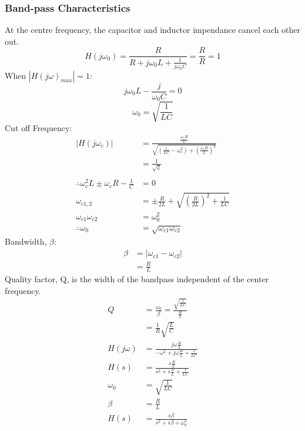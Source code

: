 \documentclass[a5paper]{article}
\begin{document}
	\subsubsection{Band-pass Characteristics}
	At the centre frequency, the capacitor and inductor impendance cancel each other out.
	$$H(j\omega_{0})=\frac{R}{R+j\omega_{0}L+\frac{1}{j\omega_{0}C}}=\frac{R}{R}=1$$
	When $|H(j\omega)_{max}|=1$:
	$$j\omega_{0}L-\frac{j}{\omega_{0}C}=0$$
	$$\omega_{0}=\sqrt{\frac{1}{LC}}$$
	Cut off Frequency:
	\begin{align*}
		|H(j\omega_{c})|&=\frac{\frac{\omega_{c}R}{L}}{\sqrt{\left(\frac{1}{LC}-\omega_{c}^{2}\right)+\left(\frac{\omega_{c}R}{L}\right)^{2}}}\\
		&=\frac{1}{\sqrt{2}}\\\\
		\therefore\omega_{c}^{2}L\pm\omega_{c}R-\frac{1}{C}&=0\\
		\omega_{c1,2}&=\pm\frac{R}{2L}+\sqrt{\left(\frac{R}{2L}\right)^{2}+\frac{1}{LC}}\\
		\omega_{c1}\omega_{c2}&=\omega_{0}^{2}\\
		\therefore\omega_{0}&=\sqrt{\omega_{c1}\omega_{c2}}
	\end{align*}
	Bandwidth, $\beta$:
	\begin{align*}
		\beta&=|\omega_{c1}-\omega_{c2}|\\
		&=\frac{R}{L}
	\end{align*}
	Quality factor, Q, is the width of the bandpass independent of the center frequency.
	\begin{align*}
		Q&=\frac{\omega_{0}}{\beta}=\frac{\sqrt{\frac{1}{LC}}}{\frac{R}{L}}\\
		&=\frac{1}{R}\sqrt{\frac{L}{C}}\\
		H(j\omega)&=\frac{j\omega\frac{R}{L}}{-\omega^{2}+j\omega\frac{R}{L}+\frac{1}{LC}}\\
		H(s)&=\frac{s\frac{R}{L}}{s^{2}+s\frac{R}{L}+\frac{1}{LC}}\\
		\omega_{0}&=\sqrt{\frac{1}{LC}}\\
		\beta&=\frac{R}{L}\\
		H(s)&=\frac{s\beta}{s^{2}+s\beta+\omega_{0}^{2}}
	\end{align*}
\end{document}
